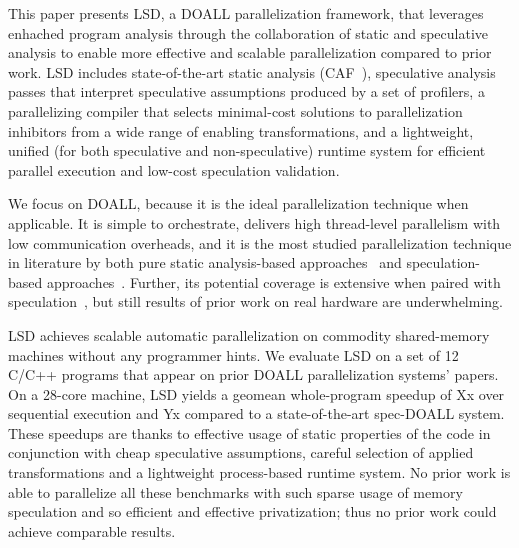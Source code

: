 This paper presents LSD, a DOALL parallelization framework, that leverages
enhached program analysis through the collaboration of static and speculative
analysis to enable more effective and scalable parallelization compared to prior
work.
%
%
LSD includes state-of-the-art static analysis (CAF~\cite{johnson:cgo:17}),
speculative analysis passes that interpret speculative assumptions produced by a
set of profilers, a parallelizing
compiler that selects minimal-cost solutions to parallelization inhibitors from
a wide range of enabling transformations, and a lightweight, unified (for both
speculative and non-speculative) runtime system for efficient parallel execution
and low-cost speculation validation.
%

We focus on DOALL, because it is the ideal parallelization technique when
applicable. It is simple to orchestrate, delivers high thread-level parallelism
with low communication overheads, and it is the most studied parallelization
technique in literature by both pure static analysis-based
approaches~\cite{..,.,..} and speculation-based approaches~\cite{..,..,..,..}.
Further, its potential coverage is extensive when paired with
speculation~\cite{zhong:08:hpca}, but still results of prior work on real
hardware are underwhelming.

LSD achieves scalable automatic parallelization on commodity shared-memory
machines without any programmer hints.  We evaluate LSD on a set of 12 C/C++
programs that appear on prior DOALL parallelization systems' papers. On a
28-core machine, LSD yields a geomean whole-program speedup of Xx over
sequential execution and Yx compared to a state-of-the-art spec-DOALL system.
These speedups are thanks to effective usage of static properties of the code in
conjunction with cheap speculative assumptions, careful selection of applied
transformations and a lightweight process-based runtime system.  No prior work
is able to parallelize all these benchmarks with such sparse usage of memory
speculation and so efficient and effective privatization; thus no prior work
could achieve comparable results.
